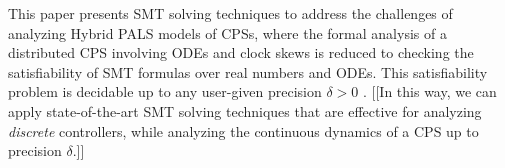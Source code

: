 
This paper presents SMT solving techniques to address the challenges
of analyzing Hybrid PALS models of CPSs, where the formal analysis of
a distributed CPS involving ODEs and clock skews is reduced to
checking the satisfiability of SMT formulas over real numbers and ODEs.
This  satisfiability problem
 is decidable up to any user-given precision $\delta > 0$ \cite{delta-comp,sat-ode}.
[[In this way, 
we can apply state-of-the-art SMT solving techniques that are %
effective for analyzing \emph{discrete} controllers,
while  analyzing
the continuous dynamics of a CPS up to precision $\delta$.]] 



